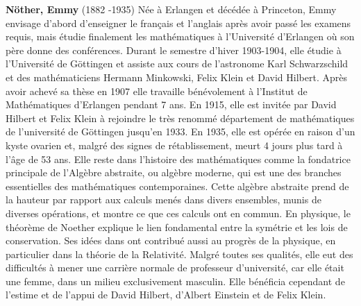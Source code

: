 \textbf{Nöther, Emmy} (1882 -1935) Née à Erlangen et décédée à Princeton, Emmy envisage d'abord d'enseigner le français et l'anglais après avoir passé les examens requis, mais étudie finalement les mathématiques à l'Université d'Erlangen où son père donne des conférences. Durant le semestre d'hiver 1903-1904, elle étudie à l'Université de Göttingen et assiste aux cours de l'astronome Karl Schwarzschild et des mathématiciens Hermann Minkowski, Felix Klein et David Hilbert. Après avoir achevé sa thèse en 1907 elle travaille bénévolement à l'Institut de Mathématiques d'Erlangen pendant 7 ans. En 1915, elle est invitée par David Hilbert et Felix Klein à rejoindre le très renommé département de mathématiques de l'université de Göttingen jusqu'en 1933. En 1935, elle est opérée en raison d'un kyste ovarien et, malgré des signes de rétablissement, meurt 4 jours plus tard à l'âge de 53 ans. Elle reste dans l'histoire des mathématiques comme la fondatrice principale de l'Algèbre abstraite, ou algèbre moderne, qui est une des branches essentielles des mathématiques contemporaines. Cette algèbre abstraite prend de la hauteur par rapport aux calculs menés dans divers ensembles, munis de diverses opérations, et montre ce que ces calculs ont en commun. En physique, le théorème de Noether explique le lien fondamental entre la symétrie et les lois de conservation. Ses idées dans  ont contribué aussi au progrès de la physique, en particulier dans la théorie de la Relativité. Malgré toutes ses qualités, elle eut des difficultés à mener une carrière normale de professeur d'université, car elle était une femme, dans un milieu exclusivement masculin. Elle bénéficia cependant de l'estime et de l'appui de David Hilbert, d'Albert Einstein et de Felix Klein.

{}
\label{sec:O}

